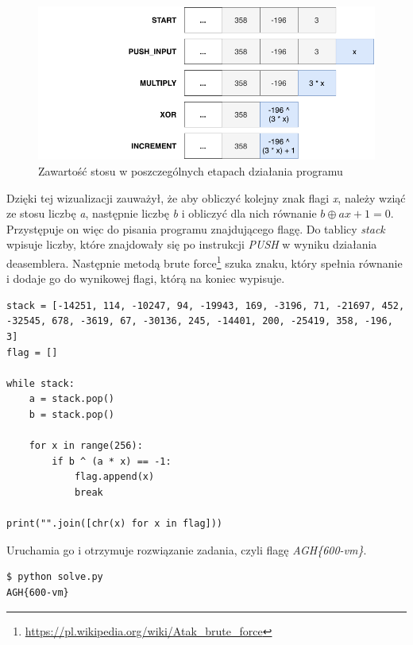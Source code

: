 \documentclass[language=polish,type=eng]{aghmodern}
\begin{document}
\begin{figure}[H]
\centering
\includegraphics[width=12cm]{600_stack}
\caption{Zawartość stosu w poszczególnych etapach działania programu}
\end{figure}

Dzięki tej wizualizacji zauważył, że aby obliczyć kolejny znak flagi \emph{x},
należy wziąć ze stosu liczbę \emph{a}, następnie liczbę \emph{b}
i obliczyć dla nich równanie \(b \oplus ax + 1 = 0\).
Przystępuje on więc do pisania programu znajdującego flagę.
Do tablicy \emph{stack} wpisuje liczby, które znajdowały się po instrukcji
\emph{PUSH} w wyniku działania deasemblera. Następnie metodą brute force\footnote{
\url{https://pl.wikipedia.org/wiki/Atak_brute_force}} szuka znaku, który spełnia
równanie i dodaje go do wynikowej flagi, którą na koniec wypisuje.

\begin{verbatim}
stack = [-14251, 114, -10247, 94, -19943, 169, -3196, 71, -21697, 452, -32545, 678, -3619, 67, -30136, 245, -14401, 200, -25419, 358, -196, 3]
flag = []

while stack:
    a = stack.pop()
    b = stack.pop()

    for x in range(256):
        if b ^ (a * x) == -1:
            flag.append(x)
            break

print("".join([chr(x) for x in flag]))
\end{verbatim}

Uruchamia go i otrzymuje rozwiązanie zadania, czyli flagę \emph{AGH\{600-vm\}}.

\begin{verbatim}
$ python solve.py
AGH{600-vm}
\end{verbatim}

\backmatter

\cleardoublepage
\listoffigures


\cleardoublepage
\printbibliography
\end{document}
